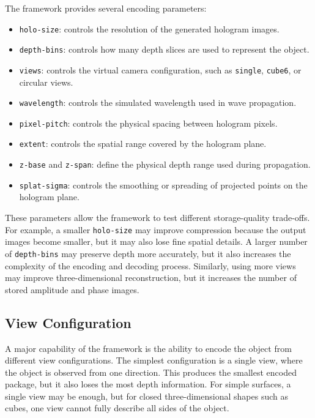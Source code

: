 \documentclass{article}
\begin{document}
\begin{normalsize}
The framework provides several encoding parameters:

\begin{itemize}
    \item \texttt{holo-size}: controls the resolution of the generated hologram images.
    \item \texttt{depth-bins}: controls how many depth slices are used to represent the object.
    \item \texttt{views}: controls the virtual camera configuration, such as \texttt{single}, \texttt{cube6}, or circular views.
    \item \texttt{wavelength}: controls the simulated wavelength used in wave propagation.
    \item \texttt{pixel-pitch}: controls the physical spacing between hologram pixels.
    \item \texttt{extent}: controls the spatial range covered by the hologram plane.
    \item \texttt{z-base} and \texttt{z-span}: define the physical depth range used during propagation.
    \item \texttt{splat-sigma}: controls the smoothing or spreading of projected points on the hologram plane.
\end{itemize}

These parameters allow the framework to test different storage-quality trade-offs. For example, a smaller \texttt{holo-size} may improve compression because the output images become smaller, but it may also lose fine spatial details. A larger number of \texttt{depth-bins} may preserve depth more accurately, but it also increases the complexity of the encoding and decoding process. Similarly, using more views may improve three-dimensional reconstruction, but it increases the number of stored amplitude and phase images.

\subsection{View Configuration}

A major capability of the framework is the ability to encode the object from different view configurations. The simplest configuration is a single view, where the object is observed from one direction. This produces the smallest encoded package, but it also loses the most depth information. For simple surfaces, a single view may be enough, but for closed three-dimensional shapes such as cubes, one view cannot fully describe all sides of the object.


\end{normalsize}
\end{document}
